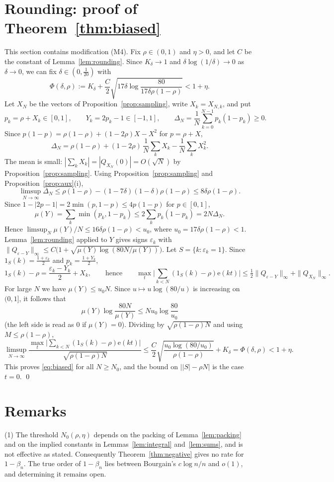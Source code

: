 \documentclass[11pt,reqno]{amsart}
\theoremstyle{definition}
\newcommand{\e}{\mathrm{e}}
\begin{document}
\section{Rounding: proof of Theorem~\ref{thm:biased}}\label{sec:rounding}
This section contains modification (M4). Fix $\rho\in(0,1)$ and $\eta>0$, and let $C$ be the constant of Lemma~\ref{lem:rounding}. Since $K_\delta\to1$ and $\delta\log(1/\delta)\to0$ as $\delta\to0$, we can fix $\delta\in(0,\frac1{20})$ with
\[
\Phi(\delta,\rho):=K_\delta+\frac C2\sqrt{17\delta\log\frac{80}{17\delta\rho(1-\rho)}}<1+\eta .
\]
Let $X_N$ be the vectors of Proposition~\ref{prop:sampling}, write $X_k=X_{N,k}$, and put
\[
p_k=\rho+X_k\in[0,1],\qquad Y_k=2p_k-1\in[-1,1],\qquad \Delta_N=\frac1N\sum_{k=0}^{N-1}p_k(1-p_k)\ge0 .
\]
Since $p(1-p)=\rho(1-\rho)+(1-2\rho)X-X^2$ for $p=\rho+X$,
\[
\Delta_N=\rho(1-\rho)+(1-2\rho)\,\frac1N\sum_kX_k-\frac1N\sum_kX_k^2 .
\]
The mean is small: $|\sum_kX_k|=|Q_{X_N}(0)|=O(\sqrt N)$ by Proposition~\ref{prop:sampling}. Using Proposition~\ref{prop:sampling} and Proposition~\ref{prop:aux}(i),
\[
\limsup_{N\to\infty}\Delta_N\le\rho(1-\rho)-(1-7\delta)(1-\delta)\rho(1-\rho)\le8\delta\rho(1-\rho).
\]
Since $1-|2p-1|=2\min(p,1-p)\le4p(1-p)$ for $p\in[0,1]$,
\[
\mu(Y)=\sum_k\min(p_k,1-p_k)\le2\sum_kp_k(1-p_k)=2N\Delta_N .
\]
Hence $\limsup_N\mu(Y)/N\le16\delta\rho(1-\rho)<u_0$, where $u_0=17\delta\rho(1-\rho)<1$. Lemma~\ref{lem:rounding} applied to $Y$ gives signs $\varepsilon_k$ with $\|Q_{\varepsilon-Y}\|_\infty\le C\big(1+\sqrt{\mu(Y)\log(80N/\mu(Y))}\big)$. Let $S=\{k:\varepsilon_k=1\}$. Since $1_S(k)=\frac{1+\varepsilon_k}2$ and $p_k=\frac{1+Y_k}2$,
\[
1_S(k)-\rho=\frac{\varepsilon_k-Y_k}2+X_k,\qquad\text{hence}\qquad\max_t\Big|\sum_{k<N}(1_S(k)-\rho)\e(kt)\Big|\le\tfrac12\|Q_{\varepsilon-Y}\|_\infty+\|Q_{X_N}\|_\infty .
\]
For large $N$ we have $\mu(Y)\le u_0N$. Since $u\mapsto u\log(80/u)$ is increasing on $(0,1]$, it follows that
\[
\mu(Y)\log\frac{80N}{\mu(Y)}\le Nu_0\log\frac{80}{u_0}
\]
(the left side is read as $0$ if $\mu(Y)=0$). Dividing by $\sqrt{\rho(1-\rho)N}$ and using $M\le\rho(1-\rho)$,
\[
\limsup_{N\to\infty}\frac{\max_t\big|\sum_{k<N}(1_S(k)-\rho)\e(kt)\big|}{\sqrt{\rho(1-\rho)N}}\le\frac C2\sqrt{\frac{u_0\log(80/u_0)}{\rho(1-\rho)}}+K_\delta=\Phi(\delta,\rho)<1+\eta .
\]
This proves \eqref{eq:biased} for all $N\ge N_0$, and the bound on $\big||S|-\rho N\big|$ is the case $t=0$. \qed

\section{Remarks}
(1) The threshold $N_0(\rho,\eta)$ depends on the packing of Lemma~\ref{lem:packing} and on the implied constants in Lemmas~\ref{lem:integral} and~\ref{lem:sums}, and is not effective as stated. Consequently Theorem~\ref{thm:negative} gives no rate for $1-\beta_n$. The true order of $1-\beta_n$ lies between Bourgain's $c\log n/n$ and $o(1)$, and determining it remains open.
\end{document}
